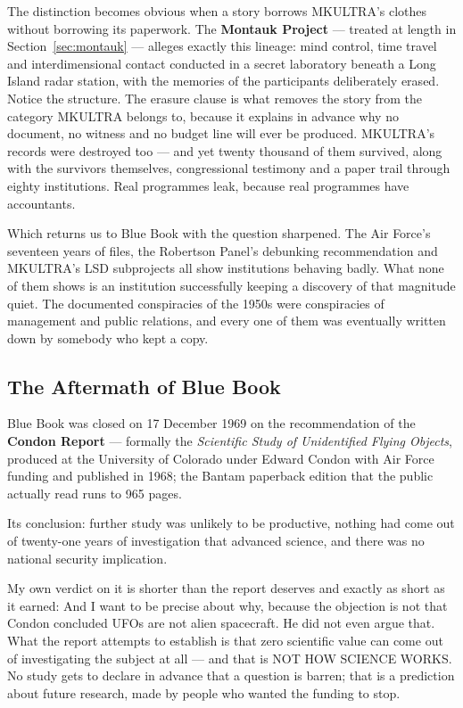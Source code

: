 The distinction becomes obvious when a story borrows MKULTRA's clothes without borrowing its
paperwork. The \textbf{Montauk Project} --- treated at length in
Section~\ref{sec:montauk} --- alleges exactly this lineage: mind control, time travel and
interdimensional contact conducted in a secret laboratory beneath a Long Island radar station,
with the memories of the participants deliberately erased. Notice the structure. The erasure
clause is what removes the story from the category MKULTRA belongs to, because it explains in
advance why no document, no witness and no budget line will ever be produced. MKULTRA's records
were destroyed too --- and yet twenty thousand of them survived, along with the survivors
themselves, congressional testimony and a paper trail through eighty institutions. Real
programmes leak, because real programmes have accountants. 

Which returns us to Blue Book with the question sharpened. The Air Force's seventeen years of
files, the Robertson Panel's debunking recommendation and MKULTRA's LSD subprojects all show
institutions behaving badly. What none of them shows is an institution successfully keeping a
discovery of that magnitude quiet. The documented conspiracies of the 1950s were conspiracies
of management and public relations, and every one of them was eventually written down by
somebody who kept a copy.

\subsection{The Aftermath of Blue Book}\label{sec:aftermathbluebook}

Blue Book was closed on 17 December 1969 on the recommendation of the \textbf{Condon Report} ---
formally the \emph{Scientific Study of Unidentified Flying Objects}, produced at the University
of Colorado under Edward Condon with Air Force funding and published in 1968; the Bantam
paperback edition that the public actually read runs to 965 pages.

Its conclusion: further study was unlikely to be productive, nothing had come out of
twenty-one years of investigation that advanced science, and there was no national security
implication.

My own verdict on it is shorter than the report deserves and exactly as short as it earned:
 And I want to be precise about why,
because the objection is not that Condon concluded UFOs are not alien spacecraft. He did not
even argue that. What the report attempts to establish is that zero scientific value can come
out of investigating the subject at all --- and that is NOT HOW SCIENCE WORKS. No study gets to
declare in advance that a question is barren; that is a prediction about future research, made
by people who wanted the funding to stop.

